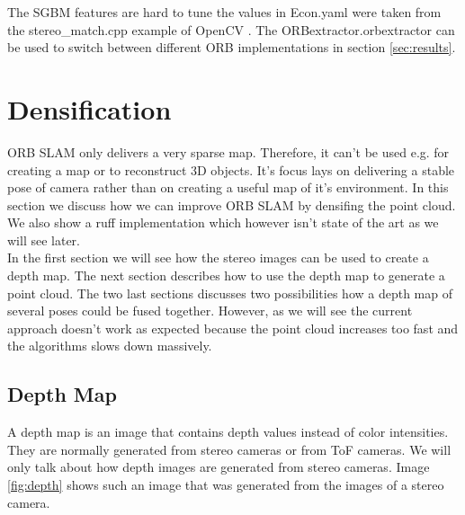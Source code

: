 \documentclass[11pt,a4paper,titlepage,oneside]{report}
\begin{document}
The SGBM features are hard to tune the values in Econ.yaml were taken from the stereo\_match.cpp example of OpenCV \cite{opencv_se}. The ORBextractor.orbextractor can be used to switch between different ORB implementations in section \ref{sec:results}.

\chapter{Densification}

ORB SLAM only delivers a very sparse map. Therefore, it can't be used e.g. for creating a map or to reconstruct 3D objects. It's focus lays on delivering a stable pose of camera rather than on creating a useful map of it's environment. In this section we discuss how we can improve ORB SLAM by densifing the point cloud. We also show a ruff implementation which however isn't state of the art as we will see later.\\
In the first section we will see how the stereo images can be used to create a depth map. The next section describes how to use the depth map to generate a point cloud. The two last sections discusses two possibilities how a depth map of several poses could be fused together. However, as we will see the current approach doesn't work as expected because the point cloud increases too fast and the algorithms slows down massively.

\section{Depth Map}

A depth map is an image that contains depth values instead of color intensities. They are normally generated from stereo cameras or from ToF cameras. We will only talk about how depth images are generated from stereo cameras. Image \ref{fig:depth} shows such an image that was generated from the images of a stereo camera.
\end{document}
